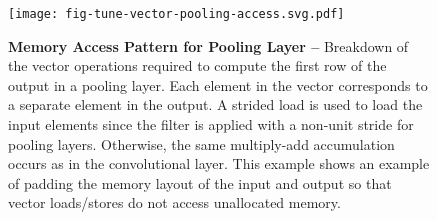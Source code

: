 
\begin{figure}[h]

  \centering
  \texttt{[image: fig-tune-vector-pooling-access.svg.pdf]}

  \caption{\textbf{Memory Access Pattern for Pooling Layer --}
    Breakdown of the vector operations required to compute the first row
    of the output in a pooling layer. Each element in the vector
    corresponds to a separate element in the output. A strided load is
    used to load the input elements since the filter is applied with a
    non-unit stride for pooling layers. Otherwise, the same multiply-add
    accumulation occurs as in the convolutional layer. This example shows
    an example of padding the memory layout of the input and output so
    that vector loads/stores do not access unallocated memory.}

  \label{fig-tuning-vectorization-pooling-access}

\end{figure}
